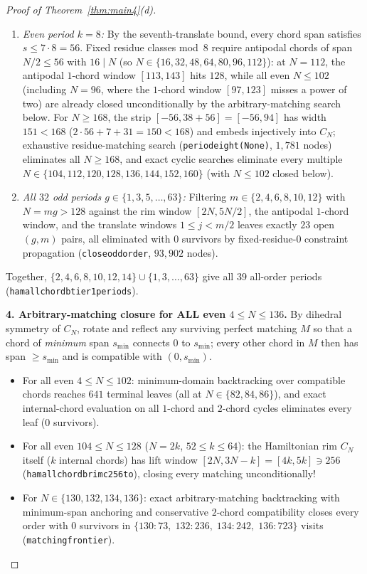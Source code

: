 \documentclass[11pt,reqno]{amsart}
\theoremstyle{plain}
\theoremstyle{definition}
\theoremstyle{remark}
\DeclareRobustCommand{\_}{\ifmmode\text{\textunderscore}\else\textunderscore\allowbreak\fi}
\begin{document}
\begin{proof}[Proof of Theorem~\ref{thm:main4}(d)]
\begin{itemize}[leftmargin=1.6em]
\begin{enumerate}[label=(\alph*),leftmargin=1.8em]
    \item \emph{Even period $k = 8$:} By the seventh-translate bound, every chord span satisfies $s \le 7 \cdot 8 = 56$. Fixed residue classes mod~$8$ require antipodal chords of span $N/2 \le 56$ with $16 \mid N$ (so $N \in \{16, 32, 48, 64, 80, 96, 112\}$): at $N = 112$, the antipodal $1$-chord window $[113, 143]$ hits $128$, while all even $N \le 102$ (including $N = 96$, where the $1$-chord window $[97, 123]$ misses a power of two) are already closed unconditionally by the arbitrary-matching search below. For $N \ge 168$, the strip $[-56, 38 + 56] = [-56, 94]$ has width $151 < 168$ ($2 \cdot 56 + 7 + 31 = 150 < 168$) and embeds injectively into $C_N$; exhaustive residue-matching search (\texttt{period\_eight(None)}, $1{,}781$ nodes) eliminates all $N \ge 168$, and exact cyclic searches eliminate every multiple $N \in \{104, 112, 120, 128, 136, 144, 152, 160\}$ (with $N \le 102$ closed below).
    \item \emph{All $32$ odd periods $g \in \{1, 3, 5, \dots, 63\}$:} Filtering $m \in \{2, 4, 6, 8, 10, 12\}$ with $N = m g > 128$ against the rim window $[2N, 5N/2]$, the antipodal $1$-chord window, and the translate windows $1 \le j < m/2$ leaves exactly $23$ open $(g, m)$ pairs, all eliminated with $0$ survivors by fixed-residue-0 constraint propagation (\texttt{close\_odd\_order}, $93{,}902$ nodes).
  \end{enumerate}
  Together, $\{2, 4, 6, 8, 10, 12, 14\} \cup \{1, 3, \dots, 63\}$ give all $39$ all-order periods (\texttt{ham\_all\_chord\_b\_tier1\_periods\_39}).
\end{itemize}

\medskip
\noindent\textbf{4. Arbitrary-matching closure for ALL even $4 \le N \le 136$.}
By dihedral symmetry of $C_N$, rotate and reflect any surviving perfect matching $M$ so that a chord of \emph{minimum} span $s_{\min}$ connects $0$ to $s_{\min}$; every other chord in $M$ then has span $\ge s_{\min}$ and is compatible with $(0, s_{\min})$.
\begin{itemize}[leftmargin=1.6em]
  \item For all even $4 \le N \le 102$: minimum-domain backtracking over compatible chords reaches $641$ terminal leaves (all at $N \in \{82, 84, 86\}$), and exact internal-chord evaluation on all $1$-chord and $2$-chord cycles eliminates every leaf ($0$ survivors).
  \item For all even $104 \le N \le 128$ ($N = 2k$, $52 \le k \le 64$): the Hamiltonian rim $C_N$ itself ($k$ internal chords) has lift window $[2N, 3N - k] = [4k, 5k] \ni 256$ (\texttt{ham\_all\_chord\_b\_rim\_c256\_104\_to\_128}), closing every matching unconditionally!
  \item For $N \in \{130, 132, 134, 136\}$: exact arbitrary-matching backtracking with minimum-span anchoring and conservative $2$-chord compatibility closes every order with $0$ survivors in $\{130: 73,\; 132: 236,\; 134: 242,\; 136: 723\}$ visits (\texttt{matching\_frontier}). \qedhere
\end{itemize}
\end{proof}
\end{document}
